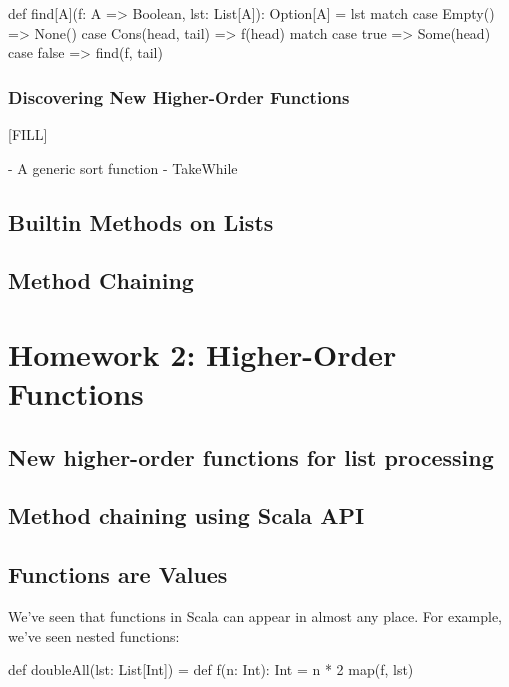 \documentclass{book}
\begin{document}
\begin{scalacode}
def find[A](f: A => Boolean, lst: List[A]): Option[A] = lst match {
  case Empty() => None()
  case Cons(head, tail) => f(head) match {
    case true => Some(head)
    case false => find(f, tail)
  }
}
\end{scalacode}


\subsection{Discovering New Higher-Order Functions}

[FILL]

- A generic sort function
- TakeWhile

\section{Builtin Methods on Lists}

\section{Method Chaining}

\chapter{Homework 2: Higher-Order Functions}

\section{New higher-order functions for list processing}
\section{Method chaining using Scala API}

\newlecture

\section{Functions are Values}

We've seen that functions in Scala can appear in almost any place. For example,
we've seen nested functions:

\begin{scalacode}
def doubleAll(lst: List[Int]) = {
  def f(n: Int): Int = n * 2
  map(f, lst)
}
\end{scalacode}
\end{document}
